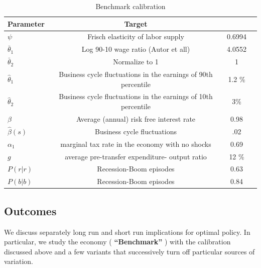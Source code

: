 \documentclass[thmsb,11pt]{article}
\begin{document}
{\small
\begin{table}[htp]
{\small
\begin{tabular}{|l|c|c|c|}
\hline
Parameter & Target &  &  \\ \hline
$\psi$ & Frisch elasticity of labor supply & 0.6994 &  \\
$\bar{\theta}_1 $ & Log 90-10 wage ratio (Autor et all) & 4.0552 &  \\
$\bar{\theta}_2 $ & Normalize to 1 & 1 &  \\
$\hat {\theta}_1$ & Business cycle fluctuations in the earnings of 90th
percentile & 1.2 \% &  \\
$\hat{\theta}_2$ & Business cycle fluctuations in the earnings of 10th
percentile & 3\% &  \\
$\beta$ & Average (annual) risk free interest rate & 0.98 &  \\
$\hat{\beta}(s)$ & Business cycle fluctuations & .02 &  \\
$\alpha_1$ & marginal tax rate in the economy with no shocks & 0.69 &  \\
$g$ & average pre-transfer expenditure- output ratio & 12 \% &  \\
$P(r|r)$ & Recession-Boom episodes & 0.63 &  \\
$P(b|b)$ & Recession-Boom episodes & 0.84 &  \\ \hline
\end{tabular}
}
\caption{Benchmark calibration}
\label{tab:Parameters}
\end{table}
}

\subsection{Outcomes}

\smallskip

\smallskip We discuss separately  long run and  short run implications
for  optimal policy. In particular, we  study the economy (\textbf{%
``Benchmark''} ) with the calibration discussed above and a few variants
that successively turn off particular sources of variation.
\end{document}
